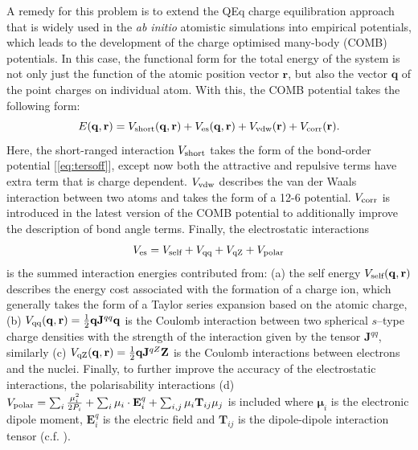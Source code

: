 A remedy for this problem is to extend the QEq charge equilibration approach\cite{rappe1991charge} that is widely used in the \textit{ab initio} atomistic simulations into empirical potentials, which leads to the development of the charge optimised many-body (COMB) potentials. In this case, the functional form for the total energy of the system is not only just the function of the atomic position vector $\bm{r}$, but also the vector $\bm{q}$ of the point charges on individual atom. With this,  the COMB potential takes the following form:\cite{yu2007charge}
\begin{equation*}
    E(\mathbf{q},\mathbf{r})=V_{\mbox{\scriptsize{short}}}(\mathbf{q},\mathbf{r}) +V_{\mbox{\scriptsize{es}}}(\mathbf{q},\mathbf{r})+V_{\mbox{\scriptsize{vdw}}}(\mathbf{r})+V_{\mbox{\scriptsize{corr}}}(\mathbf{r}).
\end{equation*}
Here, the short-ranged interaction $V_{\mbox{\scriptsize{short}}}$ takes the form of the bond-order potential [\cref{eq:tersoff}], except now both the attractive and repulsive terms have extra term that is charge dependent.  $V_{\mbox{\scriptsize{vdw}}}$ describes the van der Waals interaction between two atoms and takes the form of a 12-6 potential. $V_{\mbox{\scriptsize{corr}}}$ is introduced in the latest version of the COMB potential to additionally improve the description of bond angle terms. Finally, the electrostatic interactions \begin{equation*}
V_{\mbox{\scriptsize{es}}}=V_{\mbox{\scriptsize{self}}}+V_{\mbox{\scriptsize{qq}}}+V_{\mbox{\scriptsize{qZ}}}+V_{\mbox{\scriptsize{polar}}}
\end{equation*} 
is the summed interaction energies contributed from: (a) the self energy $V_{\mbox{\scriptsize{self}}}(\mathbf{q},\mathbf{r})$ describes the energy cost associated with the formation of a charge ion, which generally takes the form of a Taylor series expansion based on the atomic charge, (b) $V_{\mbox{\scriptsize{qq}}}(\mathbf{q},\mathbf{r})=\frac{1}{2}\mathbf{q}\mathbf{J}^{qq}\mathbf{q}$ is the Coulomb interaction between two spherical $s$--type charge densities with the strength of the interaction given by the tensor $\mathbf{J}^{qq}$, similarly
(c) $V_{\mbox{\scriptsize{qZ}}}(\mathbf{q},\mathbf{r})=\frac{1}{2}\mathbf{q}\mathbf{J}^{qZ}\mathbf{Z}$ is the Coulomb interactions between electrons and the nuclei. Finally, to further improve the accuracy of the electrostatic interactions, the polarisability interactions (d) $V_{\mbox{\scriptsize{polar}}}=\sum_i \frac{\mu_i^2}{2P_i}+\sum_{i}\mathbf{\mu}_i\cdot \mathbf{E}^{q}_i+\sum_{i,j}\mathbf{\mu}_i\mathbf{T}_{ij}\mathbf{\mu}_j$ is included where $\bm{\mu}_i$ is the electronic dipole moment,  $\bm{E}^{q}_i$ is the electric field and $\mathbf{T}_{ij}$ is the dipole-dipole interaction tensor (c.f. \citet{stone2013theory}). 

